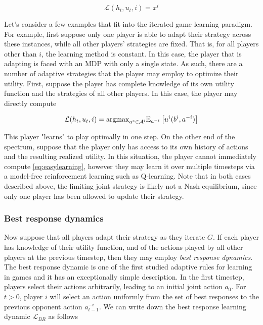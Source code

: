 \begin{equation}
    \mathcal{L}(h_t, u_t, i) = x^i
\end{equation}

Let's consider a few examples that fit into the iterated game learning paradigm. For example, first suppose only one player is able to adapt their strategy across these instances, while all other players' strategies are fixed. That is, for all players other than $i$, the learning method is constant. In this case, the player that is adapting is faced with an MDP with only a single state. As such, there are a number of adaptive strategies that the player may employ to optimize their utility. First, suppose the player has complete knowledge of its own utility function and the strategies of all other players. In this case, the player may directly compute 

\begin{equation}
    \mathcal{L}(h_t, u_t, i) = \text{argmax}_{a^* \in \AA^i} \mathbb{E}_{a^{-i}} \left[ u^i(b^i, a^{-i}) \right]
\label{eq:easylearning}
\end{equation}

This player "learns" to play optimally in one step. On the other end of the spectrum, suppose that the player only has access to its own history of actions and the resulting realized utility. In this situation, the player cannot immediately compute \ref{eq:easylearning}, however they may learn it over multiple timesteps via a model-free reinforcement learning such as Q-learning. Note that in both cases described above, the limiting joint strategy is likely not a Nash equilibrium, since only one player has been allowed to update their strategy.

\subsubsection{Best response dynamics}
Now suppose that all players adapt their strategy as they iterate $G$. If each player has knowledge of their utility function, and of the actions played by all other players at the previous timestep, then they may employ {\em best response dynamics}. The best response dynamic is one of the first studied \cite{nash1950equilibrium} adaptive rules for learning in games and it has an exceptionally simple description. In the first timestep, players select their actions arbitrarily, leading to an initial joint action $a_0$. For $t>0$, player $i$ will select an action uniformly from the set of best responses to the previous opponent action $a^{-i}_{t-1}$. We can write down the best response learning dynamic $\mathcal{L}_{BR}$ as follows


